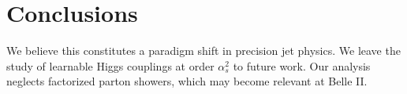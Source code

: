 \section{Conclusions}\label{sec:conclusions}

We believe this constitutes a paradigm shift in precision jet physics.
We leave the study of learnable Higgs couplings at order $\alpha_s^2$ to
future work. Our analysis neglects factorized parton showers, which may
become relevant at Belle II.


